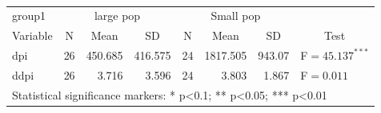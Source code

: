 \begin{table}[!htbp] \centering 
 \renewcommand*{\arraystretch}{1.1} 

\caption{}

\begin{tabular}{lrrrrrrl}
\hline
\hline
group1 & \multicolumn{3}{c}{large pop} & \multicolumn{3}{c}{Small pop} &   \\ 
 Variable & \multicolumn{1}{c}{N} & \multicolumn{1}{c}{Mean} & \multicolumn{1}{c}{SD} & \multicolumn{1}{c}{N} & \multicolumn{1}{c}{Mean} & \multicolumn{1}{c}{SD} & \multicolumn{1}{c}{Test} \\ 
\hline
dpi & 26 & 450.685 & 416.575 & 24 & 1817.505 & 943.07 & F$=45.137^{***}$ \\ 
ddpi & 26 & 3.716 & 3.596 & 24 & 3.803 & 1.867 & F$=0.011^{}$\\ 
\hline
\hline
\multicolumn{8}{l}{Statistical significance markers: * p<0.1; ** p<0.05; *** p<0.01}\\ 
\end{tabular}
\end{table}
